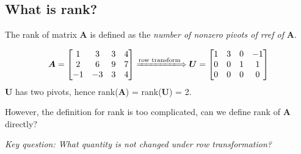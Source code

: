 \subsection{What is rank?}
\begin{definition}[Rank]
The rank of matrix $\bm A$ is defined as the \emph{number of nonzero pivots of rref of} $\bm A$.
\end{definition}
\begin{example}
\[
\bm A = \begin{bmatrix}
1&3&3&4\\2&6&9&7\\-1&-3&3&4
\end{bmatrix}
\xLongrightarrow{\text{row transform}}
\bm U = \begin{bmatrix}
1&3&0&-1\\0&0&1&1\\0&0&0&0
\end{bmatrix}
\]
$\bm U$ has two pivots, hence rank($\bm A$) = rank($\bm U$) = 2.
\end{example}
However, the definition for rank is too complicated, can we define rank of $\bm A$ directly?

\emph{Key question: What quantity is not changed under row transformation?}


